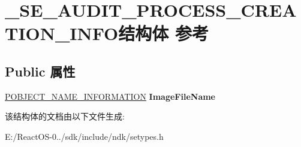 \hypertarget{struct___s_e___a_u_d_i_t___p_r_o_c_e_s_s___c_r_e_a_t_i_o_n___i_n_f_o}{}\section{\+\_\+\+S\+E\+\_\+\+A\+U\+D\+I\+T\+\_\+\+P\+R\+O\+C\+E\+S\+S\+\_\+\+C\+R\+E\+A\+T\+I\+O\+N\+\_\+\+I\+N\+F\+O结构体 参考}
\label{struct___s_e___a_u_d_i_t___p_r_o_c_e_s_s___c_r_e_a_t_i_o_n___i_n_f_o}
\subsection*{Public 属性}
\begin{DoxyCompactItemize}
\item 
\mbox{\label{struct___s_e___a_u_d_i_t___p_r_o_c_e_s_s___c_r_e_a_t_i_o_n___i_n_f_o_af7474e39408d25748263855effa1ccd5}} 
\hyperlink{struct___o_b_j_e_c_t___n_a_m_e___i_n_f_o_r_m_a_t_i_o_n}{P\+O\+B\+J\+E\+C\+T\+\_\+\+N\+A\+M\+E\+\_\+\+I\+N\+F\+O\+R\+M\+A\+T\+I\+ON} {\bfseries Image\+File\+Name}
\end{DoxyCompactItemize}


该结构体的文档由以下文件生成\+:\begin{DoxyCompactItemize}
\item 
E\+:/\+React\+O\+S-\/0../sdk/include/ndk/setypes.\+h\end{DoxyCompactItemize}
